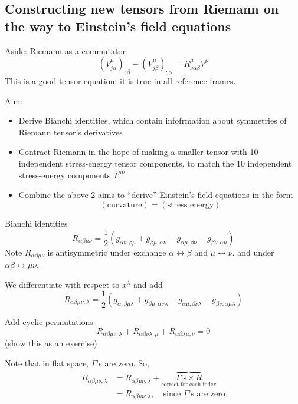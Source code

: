 \documentclass[a4paper]{article} %
\begin{document}
\subsection{Constructing new tensors from Riemann on the way to Einstein's field equations}
Aside: Riemann as a commutator
\begin{equation}
(V^{\mu}_{j\alpha})_{;\beta}-(V^{\mu}_{j\beta})_{;\alpha}=R^{\mu}_{\nu\alpha\beta}V^{\nu}
\end{equation}
This is a good tensor equation: it is true in all reference frames.

Aim:
\begin{itemize}
\item Derive Bianchi identities, which contain infofrmation about symmetries of Riemann tensor's derivatives
\item Contract Riemann in the hope of making a smaller tensor with 10 independent stress-energy tensor components, to match the 10 independent stress-energy components $T^{\mu\nu}$
\item Combine the above 2 aims to ``derive'' Einstein's field equations in the form 
\begin{equation}
(\text{curvature})=(\text{stress energy})
\end{equation} 
\end{itemize}

Bianchi identities
\begin{equation}
R_{\alpha\beta\mu\nu}=\frac{1}{2}\left(g_{\alpha\nu,\beta\mu}+g_{\beta\mu,\alpha\nu}-g_{\alpha\mu,\beta\nu}
-g_{\beta\nu,\alpha\mu}\right)
\end{equation}
Note $R_{\alpha\beta\mu\nu}$ is antisymmetric under exchange $\alpha\leftrightarrow \beta$ and $\mu \leftrightarrow \nu$, and under $\alpha \beta \leftrightarrow \mu \nu$.

We differentiate with respect to $x^{\lambda}$ and add
\begin{equation}
R_{\alpha\beta\mu\nu,\lambda}=\frac{1}{2}\left(g_{\alpha,\beta\mu\lambda}+g_{\beta\mu,\alpha\nu\lambda}
-g_{\alpha\mu,\beta\nu\lambda}-g_{\beta\nu,\alpha\mu\lambda}\right)
\end{equation}

Add cyclic permutations
\begin{equation}
R_{\alpha\beta\mu\nu,\lambda}+R_{\alpha\beta\nu\lambda,\mu}+R_{\alpha\beta\lambda\mu,\nu}=0
\end{equation}
(show this as an exercise)

Note that in flat space, $\Gamma$'s are zero. So,
\begin{align}
R_{\alpha\beta\mu\nu,\lambda}&=R_{\alpha\beta\mu\nu,\lambda}
+\overbrace{\Gamma\text{'s}\times R}_{\text{correct for each index}}\\
&=R_{\alpha\beta\mu\nu;\lambda},\quad\text{since $\Gamma$'s are zero}
\end{align}
\end{document}
